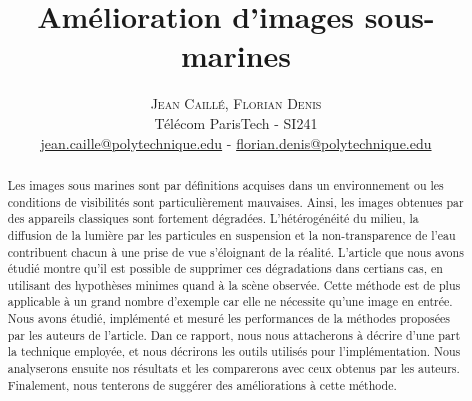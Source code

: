 \documentclass[twoside]{article}
\title{\vspace{-15mm}\fontsize{24pt}{10pt}\selectfont\textbf{Amélioration d'images sous-marines}} %
\author{
\large
\textsc{Jean Caillé, Florian Denis}\\[2mm] %
\normalsize Télécom ParisTech - SI241 \\ %
\normalsize \href{mailto:jean.caille@polytechnique.edu}{jean.caille@polytechnique.edu} - \href{mailto:florian.denis@polytechnique.edu}{florian.denis@polytechnique.edu}  %
\vspace{-5mm}
}
\date{}
\begin{document}
\maketitle %

\thispagestyle{fancy} %


\begin{abstract}

Les images sous marines sont par définitions acquises dans un environnement ou les conditions de visibilités sont particulièrement mauvaises. Ainsi, les images obtenues par des appareils classiques sont fortement dégradées. L'hétérogénéité du milieu, la diffusion de la lumière par les particules en suspension et la non-transparence de l'eau contribuent chacun à une prise de vue s'éloignant de la réalité. L'article que nous avons étudié montre qu'il est possible de supprimer ces dégradations dans certians cas, en utilisant des hypothèses minimes quand à la scène observée. Cette méthode est de plus applicable à un grand nombre d'exemple car elle ne nécessite qu'une image en entrée.\\
Nous avons étudié, implémenté et mesuré les performances de la méthodes proposées par les auteurs de l'article. Dan ce rapport, nous nous attacherons à décrire d'une part la technique employée, et nous décrirons les outils utilisés pour l'implémentation. Nous analyserons ensuite nos résultats et les comparerons avec ceux obtenus par les auteurs. Finalement, nous tenterons de suggérer des améliorations à cette méthode.\\

\end{abstract}

\end{document}
